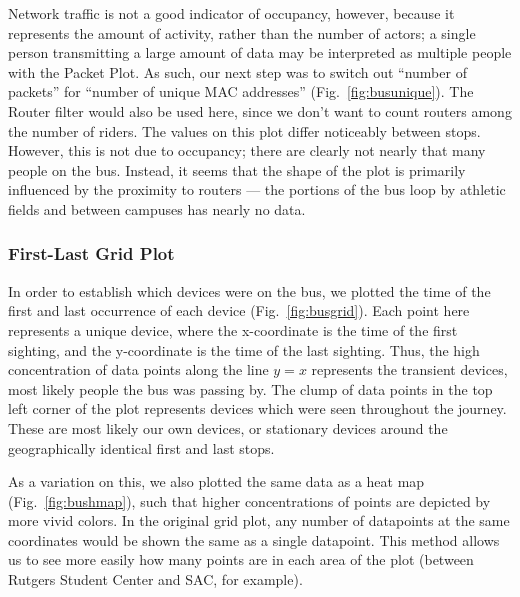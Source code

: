 Network traffic is not a good indicator of occupancy, however, because it represents the amount of activity, rather than the number of actors; a single person transmitting a large amount of data may be interpreted as multiple people with the Packet Plot.
As such, our next step was to switch out ``number of packets'' for ``number of unique MAC addresses'' (Fig.~\ref{fig:busunique}).
The Router filter would also be used here, since we don't want to count routers among the number of riders.
The values on this plot differ noticeably between stops.
However, this is not due to occupancy; there are clearly not nearly that many people on the bus.
Instead, it seems that the shape of the plot is primarily influenced by the proximity to routers --- the portions of the bus loop by athletic fields and between campuses has nearly no data.

\subsubsection*{First-Last Grid Plot}

In order to establish which devices were on the bus, we plotted the time of the first and last occurrence of each device (Fig.~\ref{fig:busgrid}).
Each point here represents a unique device, where the x-coordinate is the time of the first sighting, and the y-coordinate is the time of the last sighting.
Thus, the high concentration of data points along the line \(y=x\) represents the transient devices, most likely people the bus was passing by.
The clump of data points in the top left corner of the plot represents devices which were seen throughout the journey.
These are most likely our own devices, or stationary devices around the geographically identical first and last stops.

As a variation on this, we also plotted the same data as a heat map (Fig.~\ref{fig:bushmap}), such that higher concentrations of points are depicted by more vivid colors.
In the original grid plot, any number of datapoints at the same coordinates would be shown the same as a single datapoint.
This method allows us to see more easily how many points are in each area of the plot (between Rutgers Student Center and SAC, for example).

